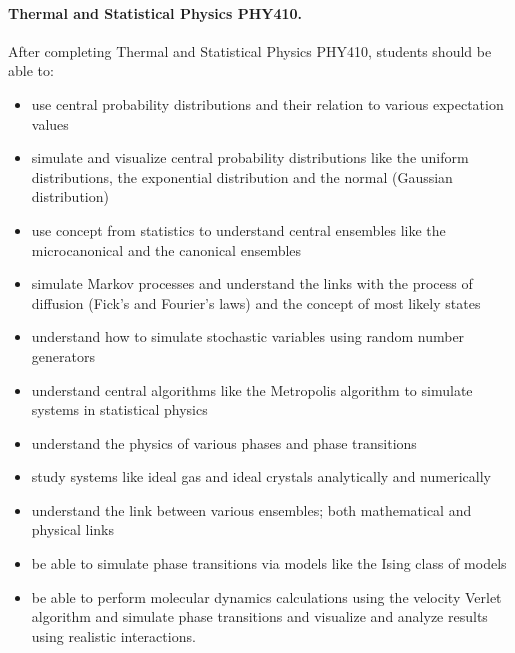 \documentclass[%
oneside,                 %
final,                   %
10pt]{article}
\begin{document}
\paragraph{Thermal and Statistical Physics PHY410.}
After completing Thermal and Statistical Physics PHY410, students should be able to:
\begin{itemize}
  \item use central probability distributions and their relation to various expectation values

  \item simulate and visualize central probability distributions like the uniform distributions, the exponential distribution and the normal (Gaussian distribution)

  \item use concept from statistics to understand central ensembles like the microcanonical and the canonical ensembles

  \item simulate Markov processes and understand the links with the process of diffusion (Fick's and Fourier's laws) and the concept of most likely states

  \item understand how to simulate stochastic variables using random number generators

  \item understand central algorithms like the Metropolis algorithm to simulate systems in statistical physics

  \item understand the physics of various phases and phase transitions 

  \item study systems like ideal gas and ideal crystals analytically and numerically

  \item understand the link between various ensembles; both mathematical and physical links

  \item be able to simulate phase transitions via models like the Ising class of models

  \item be able to perform molecular dynamics calculations using the velocity Verlet algorithm and simulate phase transitions and visualize and analyze results using realistic interactions.  
\end{itemize}

\noindent
\end{document}
